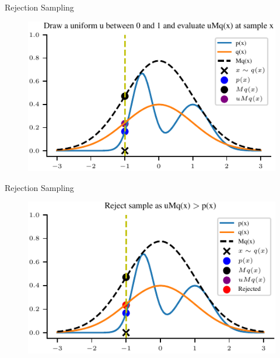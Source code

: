 \documentclass[handout]{beamer}
\begin{document}
    \begin{frame}{Rejection Sampling}
        \begin{figure}
            \centering
            \includegraphics{notebooks/figures/sampling/rejection-sampling--1.0-True-True-True-True-True-True-True-False.pdf}
        \end{figure}
    \end{frame}

    \begin{frame}{Rejection Sampling}
        \begin{figure}
            \centering
            \includegraphics{notebooks/figures/sampling/rejection-sampling--1.0-True-True-True-True-True-True-True-True.pdf}
        \end{figure}
    \end{frame}

        
    
\end{document}
